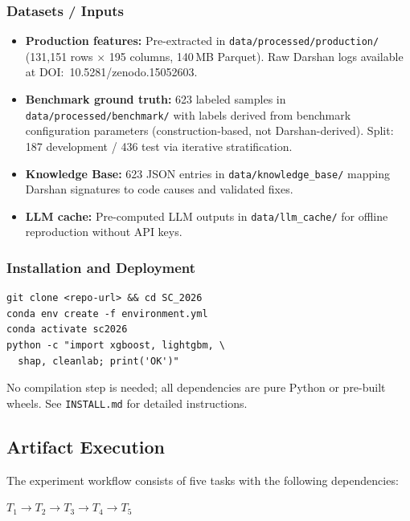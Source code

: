 \documentclass[conference]{IEEEtran}
\newcommand{\artinpart}[1]{\subsubsection*{#1}}
\newcommand{\artcomp}{\subsection*{Artifact Execution}}
\begin{document}
\artinpart{Datasets / Inputs}
\begin{itemize}
\item \textbf{Production features:} Pre-extracted in
\texttt{data/processed/production/} (131{,}151 rows $\times$ 195 columns,
140\,MB Parquet). Raw Darshan logs available at DOI:~10.5281/zenodo.15052603.
\item \textbf{Benchmark ground truth:} 623 labeled samples in
\texttt{data/processed/benchmark/} with labels derived from benchmark
configuration parameters (construction-based, not Darshan-derived).
Split: 187 development / 436 test via iterative stratification.
\item \textbf{Knowledge Base:} 623 JSON entries in
\texttt{data/knowledge\_base/} mapping Darshan signatures to code causes
and validated fixes.
\item \textbf{LLM cache:} Pre-computed LLM outputs in
\texttt{data/llm\_cache/} for offline reproduction without API keys.
\end{itemize}

\artinpart{Installation and Deployment}
\begin{verbatim}
git clone <repo-url> && cd SC_2026
conda env create -f environment.yml
conda activate sc2026
python -c "import xgboost, lightgbm, \
  shap, cleanlab; print('OK')"
\end{verbatim}
No compilation step is needed; all dependencies are pure Python or
pre-built wheels. See \texttt{INSTALL.md} for detailed instructions.

\artcomp
The experiment workflow consists of five tasks with the following
dependencies:

$T_1 \rightarrow T_2 \rightarrow T_3 \rightarrow T_4 \rightarrow T_5$
\end{document}

